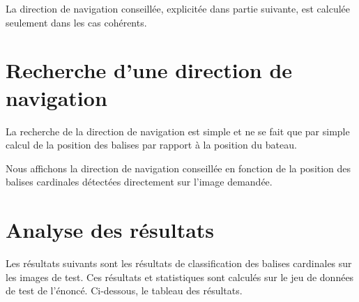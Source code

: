 \documentclass{article}
\begin{document}
La direction de navigation conseillée, explicitée dans partie suivante, est
calculée seulement dans les cas cohérents.

\section{Recherche d'une direction de navigation}

La recherche de la direction de navigation est simple et ne se fait que par
simple calcul de la position des balises par rapport à la position du bateau.

Nous affichons la direction de navigation conseillée en fonction de la position
des balises cardinales détectées directement sur l'image demandée.

\newpage
\section{Analyse des résultats}

Les résultats suivants sont les résultats de classification des balises
cardinales sur les images de test. Ces résultats et statistiques sont calculés
sur le jeu de données de test de l'énoncé. Ci-dessous, le tableau des
résultats.
\end{document}

